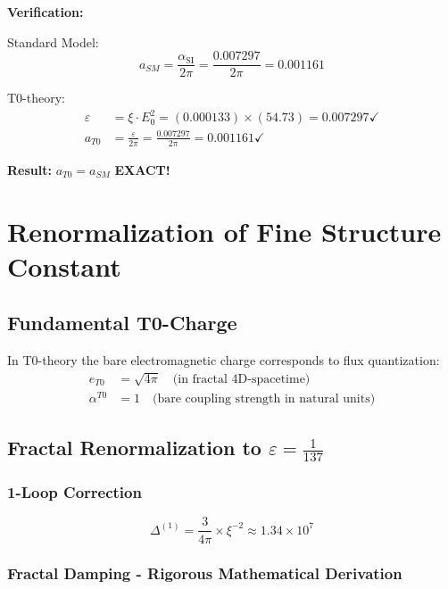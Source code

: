 \documentclass[12pt,a4paper]{article}
\numberwithin{equation}{section}
\newcommand{\xipar}{\xi}
\newcommand{\epsilonT}{\varepsilon}
\newcommand{\alphaSI}{\alpha_{\text{SI}}}
\newcommand{\alphaT}{\alpha^{T0}}
\newcommand{\Eo}{E_0}
\begin{document}
	\textbf{Verification:}
	
	Standard Model:
	\begin{equation}
		a_{SM} = \frac{\alphaSI}{2\pi} = \frac{0.007297}{2\pi} = 0.001161
	\end{equation}
	
	T0-theory:
	\begin{align}
		\epsilonT &= \xipar \cdot \Eo^2 = (0.000133) \times (54.73) = 0.007297 \checkmark\\
		a_{T0} &= \frac{\epsilonT}{2\pi} = \frac{0.007297}{2\pi} = 0.001161 \checkmark
	\end{align}
	
	\textbf{Result:} $a_{T0} = a_{SM}$ \textbf{EXACT!}
	
	\section{Renormalization of Fine Structure Constant}
	
	\subsection{Fundamental T0-Charge}
	
	In T0-theory the bare electromagnetic charge corresponds to flux quantization:
	\begin{align}
		e_{T0} &= \sqrt{4\pi} \quad \text{(in fractal 4D-spacetime)}\\
		\alphaT &= 1 \quad \text{(bare coupling strength in natural units)}
		\label{eq:naked_coupling}
	\end{align}
	
	\subsection{Fractal Renormalization to $\epsilonT = \frac{1}{137}$}
	
	\subsubsection{1-Loop Correction}
	
	\begin{equation}
		\Delta^{(1)} = \frac{3}{4\pi} \times \xipar^{-2} \approx 1.34 \times 10^7
		\label{eq:one_loop}
	\end{equation}
	
	\subsubsection{Fractal Damping - Rigorous Mathematical Derivation}
	
\end{document}
